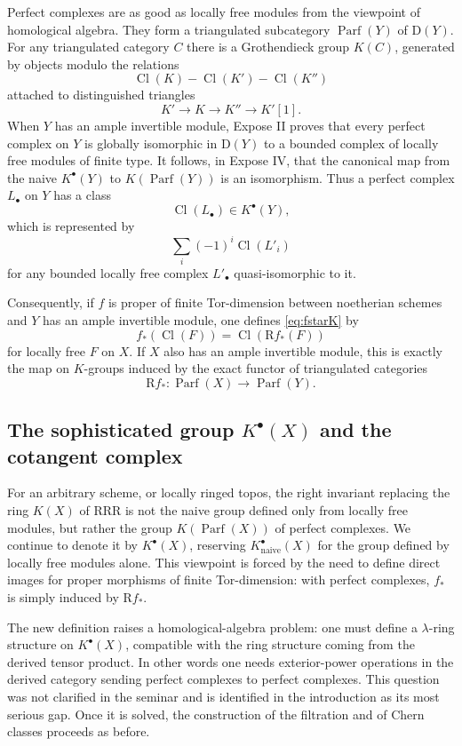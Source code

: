 \documentclass[14pt]{extarticle}
\newcommand{\Cl}{\operatorname{Cl}}
\newcommand{\Parf}{\operatorname{Parf}}
\newcommand{\R}{\mathrm R}
\newcommand{\D}{\mathrm D}
\begin{document}
Perfect complexes are as good as locally free modules from the viewpoint of homological algebra. They form a triangulated subcategory $\Parf(Y)$ of $\D(Y)$. For any triangulated category $C$ there is a Grothendieck group $K(C)$, generated by objects modulo the relations
\[
   \Cl(K)-\Cl(K')-\Cl(K'')
\]
attached to distinguished triangles
\[
   K'\to K\to K''\to K'[1].
\]
When $Y$ has an ample invertible module, Expose II proves that every perfect complex on $Y$ is globally isomorphic in $\D(Y)$ to a bounded complex of locally free modules of finite type. It follows, in Expose IV, that the canonical map from the naive $K^{\bullet}(Y)$ to $K(\Parf(Y))$ is an isomorphism. Thus a perfect complex $L_{\bullet}$ on $Y$ has a class
\[
   \Cl(L_{\bullet})\in K^{\bullet}(Y),
\]
which is represented by
\[
   \sum_i(-1)^i\Cl(L'_i)
\]
for any bounded locally free complex $L'_{\bullet}$ quasi-isomorphic to it.

Consequently, if $f$ is proper of finite Tor-dimension between noetherian schemes and $Y$ has an ample invertible module, one defines \eqref{eq:fstarK} by
\begin{equation}\label{eq:derivedpush}
   f_*(\Cl(F))=\Cl(\R f_*(F))
\end{equation}
for locally free $F$ on $X$. If $X$ also has an ample invertible module, this is exactly the map on $K$-groups induced by the exact functor of triangulated categories
\[
   \R f_*:\Parf(X)\to\Parf(Y).
\]

\subsection{The sophisticated group $K^{\bullet}(X)$ and the cotangent complex}

For an arbitrary scheme, or locally ringed topos, the right invariant replacing the ring $K(X)$ of RRR is not the naive group defined only from locally free modules, but rather the group $K(\Parf(X))$ of perfect complexes. We continue to denote it by $K^{\bullet}(X)$, reserving $K^{\bullet}_{\mathrm{naive}}(X)$ for the group defined by locally free modules alone. This viewpoint is forced by the need to define direct images for proper morphisms of finite Tor-dimension: with perfect complexes, $f_*$ is simply induced by $\R f_*$.

The new definition raises a homological-algebra problem: one must define a $\lambda$-ring structure on $K^{\bullet}(X)$, compatible with the ring structure coming from the derived tensor product. In other words one needs exterior-power operations in the derived category sending perfect complexes to perfect complexes. This question was not clarified in the seminar and is identified in the introduction as its most serious gap. Once it is solved, the construction of the filtration and of Chern classes proceeds as before.
\end{document}
